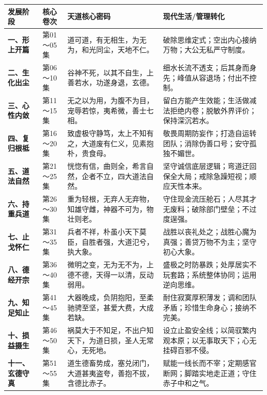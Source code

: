 \begin{center}
\small
\begin{longtable}{p{2.2cm} p{2.8cm} p{5cm} p{4.2cm}}
\toprule
\textbf{发展阶段} & \textbf{核心卷次} & \textbf{天道核心密码} & \textbf{现代生活/管理转化} \\
\midrule
\textbf{一、形上开篇} & 第01～05集 & 道可道，有无相生，为无为，和光同尘，天地不仁。 & 破除思维定式；空出内心接纳万物；大公无私严守制度。 \\
\addlinespace
\textbf{二、生化出尘} & 第06～10集 & 谷神不死，以其不自生，上善若水，功遂身退，玄德。 & 细水长流不透支；后其身而身先；峰值从容退场；付出不控制。 \\
\addlinespace
\textbf{三、心性内敛} & 第11～15集 & 无之以为用，为腹不为目，宠辱若惊，夷希微，善士七相。 & 留白方能产生效能；生活做减法拒绝内卷；脱敏外界评价；保持深沉若水。 \\
\addlinespace
\textbf{四、复归根柢} & 第16～20集 & 致虚极守静笃，太上不知有之，大道废有仁义，见素抱朴，贵食母。 & 敬畏周期防妄作；打造自运转团队；消除伪善口号；安守孤独不媚世。 \\
\addlinespace
\textbf{五、道法自然} & 第21～25集 & 恍惚有信，曲则全，希言自然，企者不立，四大道法自然。 & 坚守诚信底层逻辑；弯道迂回保全大局；戒除急躁短视；顺应天性本来。 \\
\addlinespace
\textbf{六、持重兵道} & 第26～30集 & 重为轻根，无弃人无弃物，知雄守雌，神器不可为，物壮则老。 & 守住现金流压舱石；人尽其才无废料；破除部门壁垒；不过度逞强。 \\
\addlinespace
\textbf{七、止戈怀仁} & 第31～35集 & 兵者不祥，朴虽小天下莫臣，自胜者强，大道氾兮，执大象。 & 战胜以丧礼处之；战胜心魔为真强；善贷万物不为主；坚守初心大象。 \\
\addlinespace
\textbf{八、德经开宗} & 第36～40集 & 微明之变，无为无不为，上德不德，天得一以清，反动弱用。 & 盛极之时防暴跌；处厚居实不玩套路；系统整体协同；运用逆向思维。 \\
\addlinespace
\textbf{九、知足知止} & 第41～45集 & 大器晚成，负阴抱阳，至柔驰骋至坚，甚爱大费，大成若缺。 & 耐住寂寞厚积薄发；调和团队矛盾；珍惜生命身心；接纳不完美。 \\
\addlinespace
\textbf{十、损益摄生} & 第46～50集 & 祸莫大于不知足，不出户知天下，为道日损，圣人无常心，无死地。 & 设立止盈安全线；以简驭繁内观本原；以无事取天下；心无挂碍百邪不侵。 \\
\addlinespace
\textbf{十一、玄德守真} & 第51～55集 & 道生德畜势成，塞兑闭门，大道甚夷盗夸，善抱不拔，含德比赤子。 & 赋能一线长而不宰；定期感官断网；脚踏实地走正道；守住赤子中和之气。 \\

\end{longtable}
\end{center}
